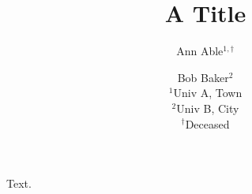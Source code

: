 \documentclass{article}
\begin{document}
\title{A Title}
\author{Ann Able$^{1,\dagger}$ \and Bob Baker$^{2}$\\ $^1$Univ A, Town\\ $^2$Univ B, City\\ $^\dagger$Deceased}
\maketitle
Text.
\end{document}
